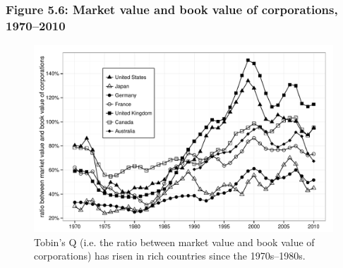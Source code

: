 \documentclass[t]{beamer}\usepackage[]{graphicx}\usepackage[]{color}
\newenvironment{knitrout}{}{} %
\begin{document}
\begin{frame}[label=Figure_5_6]
\frametitle{Figure 5.6: Market value and book value of corporations, 1970--2010}
\begin{figure}[t]
\begin{minipage}[b]{\textwidth}
\centering
\begin{knitrout}\footnotesize
{}\color{fgcolor}

{\centering \includegraphics[width=1\linewidth]{figures/bw/Figure_5_6} 

}



\end{knitrout}
\caption{Tobin's Q (i.e. the ratio between market value and book value of corporations) has risen in rich countries since the 1970s--1980s.}
\end{minipage}
\end{figure}
\end{frame}
\end{document}
